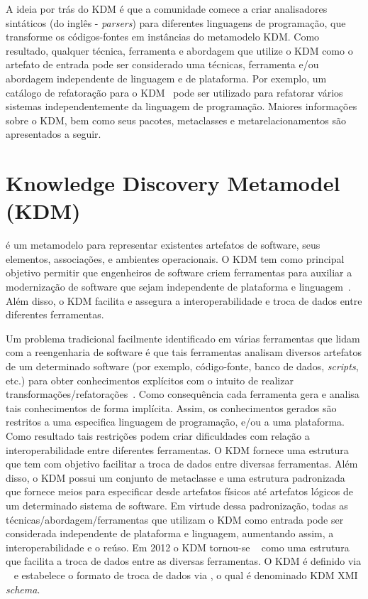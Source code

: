 A ideia por trás do KDM é que a comunidade comece a criar analisadores sintáticos (do inglês - \textit{parsers}) para diferentes linguagens de programação, que transforme os códigos-fontes em instâncias do metamodelo KDM. Como resultado, qualquer técnica, ferramenta e abordagem que utilize o KDM como o artefato de entrada pode ser considerado uma técnicas, ferramenta e/ou abordagem independente de linguagem e de plataforma. Por exemplo, um catálogo de refatoração para o KDM~\cite{durelli_catalogo, durelli_VEM_ferramenta} pode ser utilizado para refatorar vários sistemas independentemente da linguagem de programação. Maiores informações sobre o KDM, bem como seus pacotes, metaclasses e metarelacionamentos são apresentados a seguir.

\section{Knowledge Discovery Metamodel (KDM)}
\label{sec:knowledge_discovery_meta_model}

 é um metamodelo para representar existentes artefatos de software, seus elementos, associações, e ambientes operacionais. O KDM tem como principal objetivo permitir que engenheiros de software criem ferramentas para auxiliar a modernização de software que sejam independente de plataforma e linguagem~\cite{KDM:specification, PerezCastillo:2011jo, ADMCHAPTERR}. Além disso, o KDM facilita e assegura a interoperabilidade e troca de dados entre diferentes ferramentas. 

Um problema tradicional facilmente identificado em várias ferramentas que lidam com a reengenharia de software é que tais ferramentas analisam diversos artefatos de um determinado software (por exemplo, código-fonte, banco de dados, \textit{scripts}, etc.) para obter conhecimentos explícitos com o intuito de realizar transformações/refatorações~\cite{rosenberg, Canfora2011}. Como consequência cada ferramenta gera e analisa tais conhecimentos de forma implícita. Assim, os conhecimentos gerados são restritos a uma especifica linguagem de programação, e/ou a uma plataforma. Como resultado tais restrições podem criar dificuldades com relação a interoperabilidade entre diferentes ferramentas. O KDM fornece uma estrutura que tem com objetivo facilitar a troca de dados entre diversas ferramentas. Além disso, o KDM possui um conjunto de metaclasse e uma estrutura padronizada que fornece meios para especificar desde artefatos físicos até artefatos lógicos de um determinado sistema de software. Em virtude dessa padronização, todas as técnicas/abordagem/ferramentas que utilizam o KDM como entrada pode ser considerada independente de plataforma e linguagem, aumentando assim, a interoperabilidade e o reúso. Em 2012 o KDM tornou-se ~\cite{KDM:ISO} como uma estrutura que facilita a troca de dados entre as diversas ferramentas. O KDM é definido via ~\cite{MOF} e estabelece o formato de troca de dados via , o qual é denominado KDM XMI \emph{schema}.



